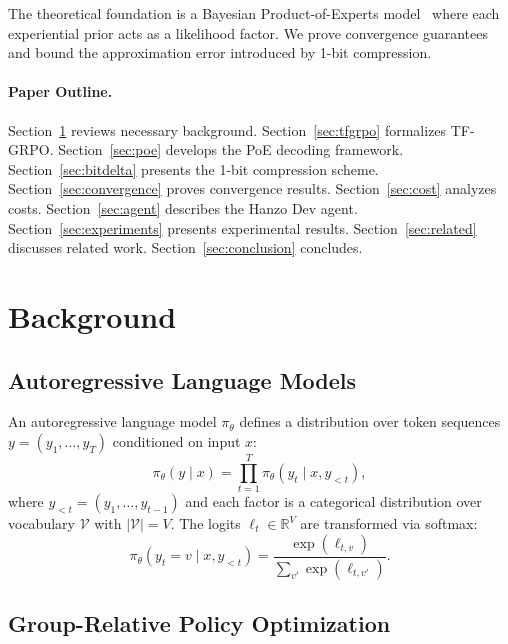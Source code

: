 \documentclass[11pt]{article}
\begin{document}
The theoretical foundation is a Bayesian Product-of-Experts
model~\cite{hinton2002training} where each experiential prior acts as a
likelihood factor. We prove convergence guarantees and bound the approximation
error introduced by 1-bit compression.

\paragraph{Paper Outline.}
Section~\ref{sec:background} reviews necessary background. Section~\ref{sec:tfgrpo}
formalizes TF-GRPO. Section~\ref{sec:poe} develops the PoE decoding framework.
Section~\ref{sec:bitdelta} presents the 1-bit compression scheme.
Section~\ref{sec:convergence} proves convergence results. Section~\ref{sec:cost}
analyzes costs. Section~\ref{sec:agent} describes the Hanzo Dev agent.
Section~\ref{sec:experiments} presents experimental results.
Section~\ref{sec:related} discusses related work. Section~\ref{sec:conclusion}
concludes.

\section{Background}
\label{sec:background}

\subsection{Autoregressive Language Models}

An autoregressive language model $\pi_\theta$ defines a distribution over token
sequences $y = (y_1, \ldots, y_T)$ conditioned on input $x$:
\begin{equation}
    \pi_\theta(y \mid x) = \prod_{t=1}^{T} \pi_\theta(y_t \mid x, y_{<t}),
\end{equation}
where $y_{<t} = (y_1, \ldots, y_{t-1})$ and each factor is a categorical
distribution over vocabulary $\mathcal{V}$ with $|\mathcal{V}| = V$. The logits
$\ell_t \in \mathbb{R}^V$ are transformed via softmax:
\begin{equation}
    \pi_\theta(y_t = v \mid x, y_{<t}) = \frac{\exp(\ell_{t,v})}{\sum_{v'} \exp(\ell_{t,v'})}.
\end{equation}

\subsection{Group-Relative Policy Optimization}
\end{document}
